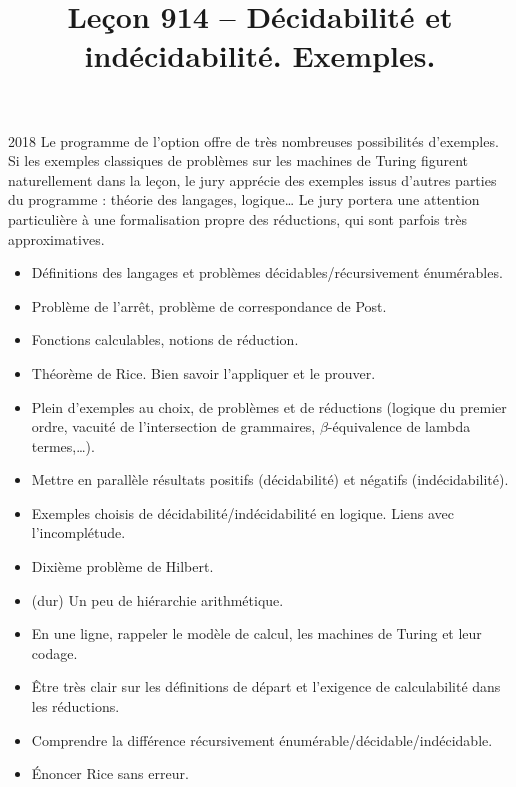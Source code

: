 \documentclass{agregfiche}
\title{Leçon 914 -- Décidabilité et indécidabilité. Exemples.}
\begin{document}
\maketitle

\secrapports

\begin{rapport}{2018}
Le programme de l'option offre de très nombreuses possibilités d'exemples. Si les exemples classiques de problèmes sur les machines de Turing figurent naturellement dans la leçon, le jury apprécie des exemples issus d'autres parties du programme : théorie des langages, logique\dots
Le jury portera une attention particulière à une formalisation propre des réductions, qui sont parfois très approximatives.
\end{rapport}

\secindispensables

\begin{itemize}
\item Définitions des langages et problèmes décidables/récursivement énumérables.
\item Problème de l'arrêt, problème de correspondance de Post.
\item Fonctions calculables, notions de réduction.
\end{itemize}

\secasavoir

\begin{itemize}
    \item Théorème de Rice. Bien savoir l'appliquer et le prouver.
    \item Plein d'exemples au choix, de problèmes et de réductions (logique du premier ordre, vacuité de l'intersection de grammaires, $\beta$-équivalence de lambda termes,\dots).
\end{itemize}


\secidees
\begin{itemize}
\item Mettre en parallèle résultats positifs (décidabilité) et négatifs (indécidabilité).
\item Exemples choisis de décidabilité/indécidabilité en logique. Liens avec l'incomplétude.
\item Dixième problème de Hilbert.
\item (dur) Un peu de hiérarchie arithmétique.
\end{itemize}

\secpieges

\begin{itemize}
\item En une ligne, rappeler le modèle de calcul, les machines de Turing et leur codage.
\item Être très clair sur les définitions de départ et l'exigence de calculabilité dans les réductions.
\item Comprendre la différence récursivement énumérable/décidable/indécidable.
\item Énoncer Rice sans erreur.
\end{itemize}
\end{document}
